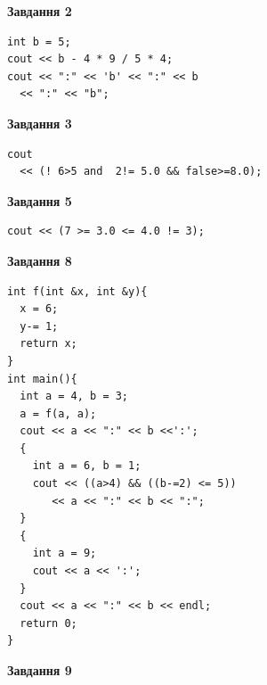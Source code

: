 \documentclass[12pt, ukrainian]{article}
\begin{document}
{\begin {large}
\begin{minipage}[t]{7.0cm}
\end{minipage}
\vline \hspace{1mm}
\begin{minipage}[t]{11.0cm}

\begin{center}
\textbf{Завдання 2}
\end{center}
\vspace{-8mm}

\begin{verbatim}
int b = 5;
cout << b - 4 * 9 / 5 * 4;
cout << ":" << 'b' << ":" << b 
  << ":" << "b";
\end{verbatim}



\begin{center}
\textbf{Завдання 3}
\end{center}
\vspace{-8mm}

\begin{verbatim}
cout 
  << (! 6>5 and  2!= 5.0 && false>=8.0);
\end{verbatim}



\begin{center}
\textbf{Завдання 5}
\end{center}
\vspace{-8mm}

\begin{verbatim}
cout << (7 >= 3.0 <= 4.0 != 3);
\end{verbatim}



\begin{center}
\textbf{Завдання 8}
\end{center}
\vspace{-8mm}

\begin{verbatim}
int f(int &x, int &y){
  x = 6;
  y-= 1;
  return x;
}
int main(){
  int a = 4, b = 3;
  a = f(a, a);
  cout << a << ":" << b <<':';
  {
    int a = 6, b = 1;
    cout << ((a>4) && ((b-=2) <= 5))
       << a << ":" << b << ":";
  }
  {
    int a = 9;
    cout << a << ':';
  }
  cout << a << ":" << b << endl;
  return 0;
}
\end{verbatim}

\end{minipage}


\begin{minipage}[t]{7.0cm}

\begin{center}
\textbf{Завдання 9}
\end{center}
\vspace{-8mm}


\end{minipage}
\end{large}}
\end{document}
